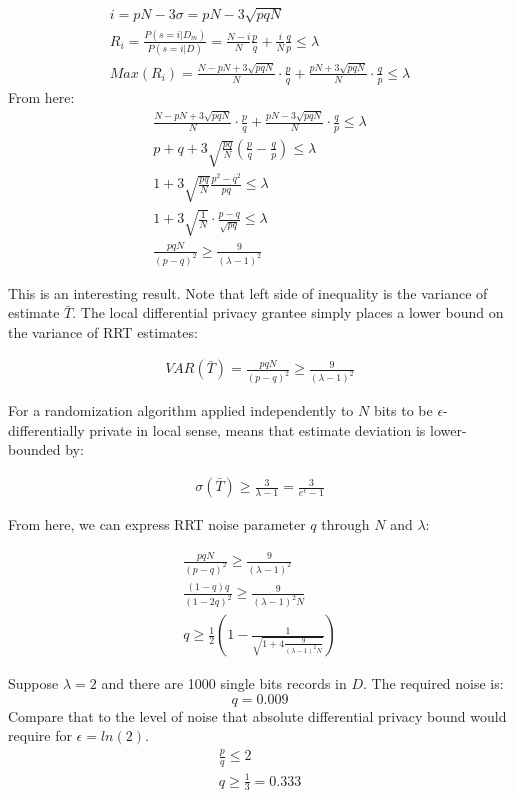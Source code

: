 \documentclass[11pt,draft]{article}
\begin{document}
\begin{align}
i = pN - 3\sigma = pN - 3\sqrt{pqN} \\
R_i = \frac{P(s=i | D_m)}{P(s=i | D)} = \frac{N-i}{N}\frac{p}{q} + \frac{i}{N} \frac{q}{p} \le \lambda \\
Max(R_i) = \frac{N-pN + 3\sqrt{pqN}}{N} \cdot \frac{p}{q} + \frac{pN + 3\sqrt{pqN}}{N} \cdot \frac{q}{p} \le \lambda
\end{align}
From here:
\begin{align}
\frac{N-pN + 3\sqrt{pqN}}{N} \cdot \frac{p}{q} + \frac{pN - 3\sqrt{pqN}}{N} \cdot \frac{q}{p} \le \lambda \\
p + q  +  3\sqrt{\frac{pq}{N}} \left ( \frac{p}{q}  - \frac{q}{p} \right )  \le \lambda \\
1 +  3\sqrt{\frac{pq}{N}} \frac{p^2 - q^2}{pq}  \le \lambda \\
1 + 3\sqrt{\frac{1}{N}}  \cdot \frac{p - q}{\sqrt{pq}}  \le \lambda \\
\frac{pqN}{(p-q)^2} \ge \frac{9}{(\lambda - 1)^2}
\end{align}

This is an interesting result. Note that left side of inequality is the variance of estimate $\bar{T}$.  The local differential privacy grantee simply places a lower bound on the variance of RRT estimates:

\begin{align}
VAR(\bar{T}) = \frac{pqN}{(p-q)^2} \ge \frac{9}{(\lambda - 1)^2}
\end{align}

For a randomization algorithm applied independently to $N$ bits to be $\epsilon$-differentially private in local sense, means that estimate deviation is lower-bounded by:

\begin{align}
\sigma(\bar{T})  \ge \frac{3}{\lambda - 1} =  \frac{3}{e^{\epsilon} - 1}
\end{align}

From here, we can express RRT noise parameter $q$ through $N$ and $\lambda$:

\begin{align}
 \frac{pqN}{(p-q)^2} \ge \frac{9}{(\lambda - 1)^2} \\
 \frac{(1-q)q}{(1-2q)^2} \ge \frac{9}{(\lambda - 1)^2N} \\
q \ge \frac{1}{2} \left (1 -  \frac{1}{\sqrt{ 1 + 4 \frac{9}{(\lambda - 1)^2N} } } \right ) 
\end{align}

Suppose  $\lambda=2$ and there are 1000 single bits records in $D$.  The required noise is:
\[
q = 0.009
\]
Compare that to the level of noise that absolute differential privacy bound would require for $\epsilon=ln(2)$. 
\begin{align}
\frac{p}{q} \le 2 \\
q \ge \frac{1}{3} =  0.333
\end{align}
\end{document}
